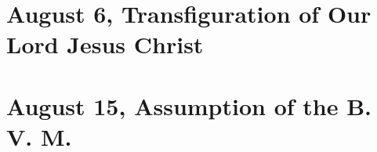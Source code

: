 {{
\bigskip
\benedicamusdomino{}
}

{
\section{August 6, Transfiguration of Our Lord Jesus Christ}
\subtitle{ Class}
\subtitle{I \& II Vespers}

\def\definevesperspropers{
  \def\prepsalmfive{\greseteolcustos{manual}}
}
\def\definevesperspropersalt{}
\def\vesperspropersnote{At II Vespers:}
\def\vesperspropersaltnote{At I Vespers:}
\def\premagverses{\greseteolcustos{manual}}
\def\printfullhymn{
  {\printhymn{\oldstylenums{\hymnlinetwo}}{\hymninitial}{\hymntex}{\hymntranslation}}
  {
    \def\vrlinebreak{T}
    \oldneedspace{3\baselineskip}
    \printvr[\greseteolcustos{manual}]{\vrtex}{\vtranslation}{\rtranslation}
  }
}

\bigskip
\benedicamusdomino{}
}

{
\section{August 15, Assumption of the B. V. M.}
\subtitle{ Class}
\subtitle{I \& II Vespers}

\def\definevesperspropers{
  \def\prepsalmfive{\greseteolcustos{manual}}
}
\def\definevesperspropersalt{}
\def\vesperspropersnote{At II Vespers:}
\def\vesperspropersaltnote{At I Vespers:}
\def\premagverses{\greseteolcustos{manual}}
\def\printfullhymn{
  {
    \oldneedspace{3\baselineskip}
    \printnote{At II Vespers: Hymn. \emph{Ave Maris Stella}, page \pageref{hymn-avemarisstella}. \Vbar{} \emph{Exaltata.} page \pageref{vr-assumption}.\\}

    \printnote{\vesperspropersaltnote}
    \definevesperspropersalt
    \printhymn{\oldstylenums{\hymnlinetwo}}{\hymninitial}{\hymntex}{\hymntranslation}
  }
  {
    \def\vrlinebreak{T}
    \oldneedspace{3\baselineskip}
    \label{vr-assumption}
    \printvr[\greseteolcustos{manual}]{\vrtex}{\vtranslation}{\rtranslation}
  }
}

}}
